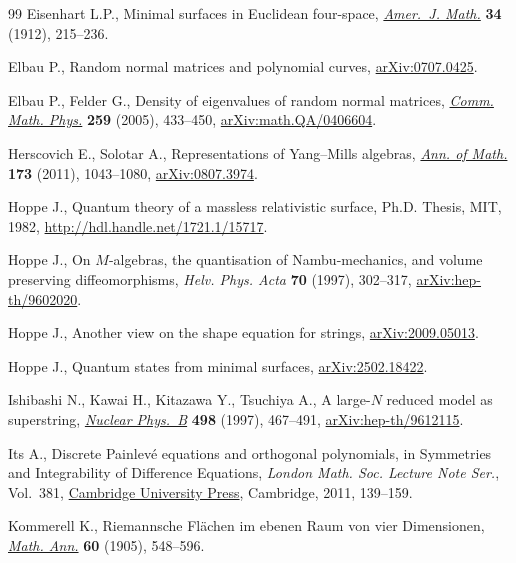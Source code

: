 \documentclass[10pt,a4paper]{amsart}
\numberwithin{equation}{section}
\theoremstyle{definition}
\begin{document}
\begin{thebibliography}{99}
Eisenhart L.P., Minimal surfaces in {E}uclidean four-space,
 \href{https://doi.org/10.2307/2370220}{\textit{Amer.~J. Math.}} \textbf{34}
 (1912), 215--236.

Elbau P., Random normal matrices and polynomial curves,
 \href{http://arxiv.org/abs/0707.0425}{arXiv:0707.0425}.

Elbau P., Felder G., Density of eigenvalues of random normal matrices,
 \href{https://doi.org/10.1007/s00220-005-1372-z}{\textit{Comm. Math. Phys.}}
 \textbf{259} (2005), 433--450,
 \href{http://arxiv.org/abs/math.QA/0406604}{arXiv:math.QA/0406604}.

Herscovich E., Solotar A., Representations of {Y}ang--{M}ills algebras,
 \href{https://doi.org/10.4007/annals.2011.173.2.12}{\textit{Ann. of Math.}}
 \textbf{173} (2011), 1043--1080,
 \href{http://arxiv.org/abs/0807.3974}{arXiv:0807.3974}.
 
Hoppe J., Quantum theory of a massless relativistic surface, Ph.D. Thesis,
 {MIT}, 1982, \url{http://hdl.handle.net/1721.1/15717}.

Hoppe J., On {$M$}-algebras, the quantisation of {N}ambu-mechanics, and volume
 preserving diffeomorphisms, \textit{Helv. Phys. Acta} \textbf{70} (1997),
 302--317, \href{http://arxiv.org/abs/hep-th/9602020}{arXiv:hep-th/9602020}.

Hoppe J., Another view on the shape equation for strings,
 \href{http://arxiv.org/abs/2009.05013}{arXiv:2009.05013}.

Hoppe J., Quantum states from minimal surfaces,
 \href{http://arxiv.org/abs/2502.18422}{arXiv:2502.18422}.

Ishibashi N., Kawai H., Kitazawa Y., Tsuchiya A., A large-{$N$} reduced model
 as superstring,
 \href{https://doi.org/10.1016/S0550-3213(97)00290-3}{\textit{Nuclear
 Phys.~B}} \textbf{498} (1997), 467--491,
 \href{http://arxiv.org/abs/hep-th/9612115}{arXiv:hep-th/9612115}.

Its A., Discrete Painlev\'e equations and orthogonal polynomials, in Symmetries
 and Integrability of Difference Equations, \textit{London Math. Soc. Lecture
 Note Ser.}, Vol.~381,
 \href{https://doi.org/10.1017/CBO9780511997136.007}{Cambridge University
 Press}, Cambridge, 2011, 139--159.

Kommerell K., Riemannsche {F}l\"achen im ebenen {R}aum von vier {D}imensionen,
 \href{https://doi.org/10.1007/BF01561096}{\textit{Math. Ann.}} \textbf{60}
 (1905), 548--596.


\end{thebibliography}
\end{document}
